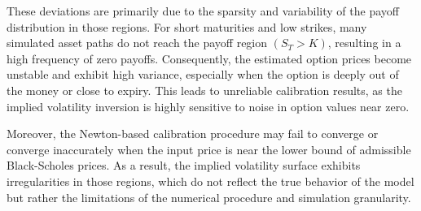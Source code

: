 These deviations are primarily due to the sparsity and variability of the payoff distribution in those regions. For short maturities and low strikes, many simulated asset paths do not reach the payoff region $(S_T > K)$, resulting in a high frequency of zero payoffs. Consequently, the estimated option prices become unstable and exhibit high variance, especially when the option is deeply out of the money or close to expiry. This leads to unreliable calibration results, as the implied volatility inversion is highly sensitive to noise in option values near zero.

Moreover, the Newton-based calibration procedure may fail to converge or converge inaccurately when the input price is near the lower bound of admissible Black-Scholes prices. As a result, the implied volatility surface exhibits irregularities in those regions, which do not reflect the true behavior of the model but rather the limitations of the numerical procedure and simulation granularity.

